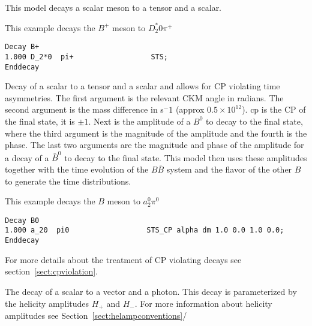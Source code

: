 
\label{sts}



\Expl
This model decays a scalar meson to a tensor and a scalar.

\Example
This example decays the $B^+$ meson to $D_2^*0\pi^+$
\begin{verbatim}
Decay B+
1.000 D_2*0  pi+                  STS;
Enddecay
\end{verbatim}

\Notes




\label{stscp}



\Expl
Decay of a scalar to a tensor and a scalar and allows for CP violating 
time asymmetries. The first argument is the relevant CKM
angle in radians. The second argument is the mass difference
in s$^-1$ (approx $0.5\times 10^{12}$).
cp is the CP of the final state, it is $\pm 1$. 
Next is the amplitude 
of a $B^0$ to decay to the final state, where the third argument is the 
magnitude of the amplitude and the fourth is the phase. The
last two arguments are the magnitude and phase of the
amplitude for a decay of a $\bar B^0$ to decay to the 
final state. This model then uses these amplitudes 
together with the time evolution of the
$B\bar B$ system and the flavor of the other
$B$ to generate the time distributions.

\Example
This example decays the $B$ meson to $a_2^0\pi^0$
\begin{verbatim}
Decay B0
1.000 a_20  pi0                  STS_CP alpha dm 1.0 0.0 1.0 0.0;
Enddecay
\end{verbatim}

\Notes
For more details about the treatment of CP violating decays 
see section~\ref{sect:cpviolation}.





\label{svphelamp}



\Expl
The decay of a scalar to a vector and a photon. This decay is
parameterized by the helicity amplitudes $H_+$ and $H_-$.
For more information about helicity amplitudes see 
Section~\ref{sect:helampconventions}/

